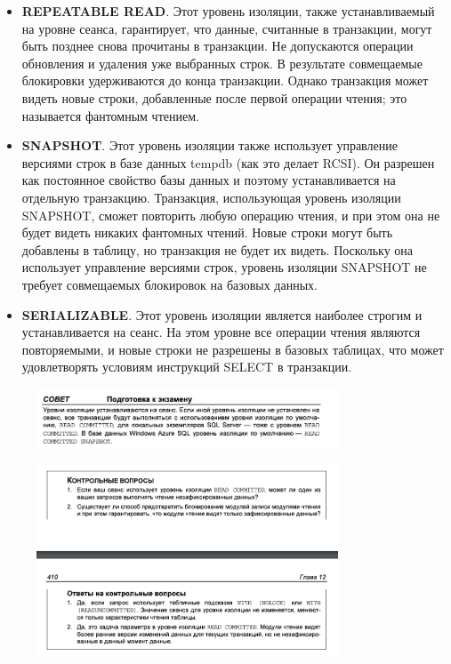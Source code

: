 \begin{itemize}
	\item \textbf{REPEATABLE READ}. Этот уровень изоляции, также устанавливаемый на уровне сеанса, гарантирует, что данные, считанные в транзакции, могут быть позднее
	снова прочитаны в транзакции. Не допускаются операции обновления и удаления уже выбранных строк. В результате совмещаемые блокировки удерживаются до конца транзакции. Однако транзакция может видеть новые строки, добавленные после первой операции чтения; это называется фантомным чтением. 
	\item \textbf{SNAPSHOT}. Этот уровень изоляции также использует управление версиями строк
	в базе данных tempdb (как это делает RCSI). Он разрешен как постоянное свойство базы данных и поэтому устанавливается на отдельную транзакцию. Транзакция, использующая уровень изоляции SNAPSHOT, сможет повторить любую операцию чтения, и при этом она не будет видеть никаких фантомных чтений. Новые строки могут быть добавлены в таблицу, но транзакция не будет их видеть.
	Поскольку она использует управление версиями строк, уровень изоляции
	SNAPSHOT не требует совмещаемых блокировок на базовых данных. 
	\item \textbf{SERIALIZABLE}. Этот уровень изоляции является наиболее строгим и устанавливается на сеанс. На этом уровне все операции чтения являются повторяемыми,
	и новые строки не разрешены в базовых таблицах, что может удовлетворять условиям инструкций SELECT в транзакции. 
\end{itemize}


\begin{figure}[h!]
	\begin{center}
		\includegraphics[width=0.8\textwidth]{img/advice27.png}
	\end{center}
	\captionsetup{justification=centering}
\end{figure}

\begin{figure}[h!]
	\begin{center}
		\includegraphics[width=0.8\textwidth]{img/control32.png}
	\end{center}
	\captionsetup{justification=centering}
\end{figure}


